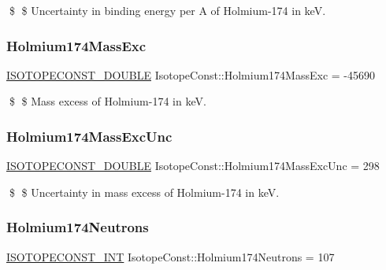 \$ \$ Uncertainty in binding energy per A of Holmium-\/174 in keV. \mbox{\label{group___isotope_const-_holmium-_ho174_ga7dacf81fb08372b48e29970b23cb6836}} 
\subsubsection{\texorpdfstring{Holmium174\+Mass\+Exc}{Holmium174MassExc}}
{\footnotesize\ttfamily \mbox{\hyperlink{group___isotope_const-_macros_ga8f45a7272ce02c0b4c65c44636ed719a}{I\+S\+O\+T\+O\+P\+E\+C\+O\+N\+S\+T\+\_\+\+D\+O\+U\+B\+LE}} Isotope\+Const\+::\+Holmium174\+Mass\+Exc = -\/45690}

\$ \$ Mass excess of Holmium-\/174 in keV. \mbox{\label{group___isotope_const-_holmium-_ho174_ga9a54c4a8cb2d5c69699b792089be498d}} 
\subsubsection{\texorpdfstring{Holmium174\+Mass\+Exc\+Unc}{Holmium174MassExcUnc}}
{\footnotesize\ttfamily \mbox{\hyperlink{group___isotope_const-_macros_ga8f45a7272ce02c0b4c65c44636ed719a}{I\+S\+O\+T\+O\+P\+E\+C\+O\+N\+S\+T\+\_\+\+D\+O\+U\+B\+LE}} Isotope\+Const\+::\+Holmium174\+Mass\+Exc\+Unc = 298}

\$ \$ Uncertainty in mass excess of Holmium-\/174 in keV. \mbox{\label{group___isotope_const-_holmium-_ho174_gab3a9f9578dd4b0f44371b8e274f299e3}} 
\subsubsection{\texorpdfstring{Holmium174\+Neutrons}{Holmium174Neutrons}}
{\footnotesize\ttfamily \mbox{\hyperlink{group___isotope_const-_macros_ga5f18360b3e99483a35c32d789e62621c}{I\+S\+O\+T\+O\+P\+E\+C\+O\+N\+S\+T\+\_\+\+I\+NT}} Isotope\+Const\+::\+Holmium174\+Neutrons = 107}

